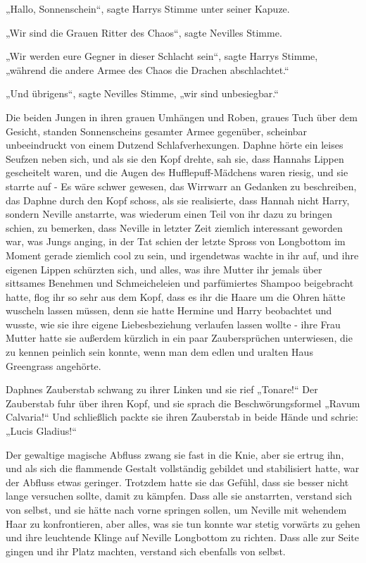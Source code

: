 {„Hallo, Sonnenschein“, sagte Harrys Stimme unter seiner Kapuze.

„Wir sind die Grauen Ritter des Chaos“, sagte Nevilles Stimme.

„Wir werden eure Gegner in dieser Schlacht sein“, sagte Harrys Stimme, „während die andere Armee des Chaos die Drachen abschlachtet.“

„Und übrigens“, sagte Nevilles Stimme, „wir sind unbesiegbar.“

Die beiden Jungen in ihren grauen Umhängen und Roben, graues Tuch über dem Gesicht, standen Sonnenscheins gesamter Armee gegenüber, scheinbar unbeeindruckt von einem Dutzend Schlafverhexungen. Daphne hörte ein leises Seufzen neben sich, und als sie den Kopf drehte, sah sie, dass Hannahs Lippen gescheitelt waren, und die Augen des Hufflepuff-Mädchens waren riesig, und sie starrte auf - Es wäre schwer gewesen, das Wirrwarr an Gedanken zu beschreiben, das Daphne durch den Kopf schoss, als sie realisierte, dass Hannah nicht Harry, sondern Neville anstarrte, was wiederum einen Teil von ihr dazu zu bringen schien, zu bemerken, dass Neville in letzter Zeit ziemlich interessant geworden war, was Jungs anging, in der Tat schien der letzte Spross von Longbottom im Moment gerade ziemlich cool zu sein, und irgendetwas wachte in ihr auf, und ihre eigenen Lippen schürzten sich, und alles, was ihre Mutter ihr jemals über sittsames Benehmen und Schmeicheleien und parfümiertes Shampoo beigebracht hatte, flog ihr so sehr aus dem Kopf, dass es ihr die Haare um die Ohren hätte wuscheln lassen müssen, denn sie hatte Hermine und Harry beobachtet und wusste, wie sie ihre eigene Liebesbeziehung verlaufen lassen wollte - ihre Frau Mutter hatte sie außerdem kürzlich in ein paar Zaubersprüchen unterwiesen, die zu kennen peinlich sein konnte, wenn man dem edlen und uralten Haus Greengrass angehörte.

Daphnes Zauberstab schwang zu ihrer Linken und sie rief „Tonare!“ Der Zauberstab fuhr über ihren Kopf, und sie sprach die Beschwörungsformel „Ravum Calvaria!“ Und schließlich packte sie ihren Zauberstab in beide Hände und schrie: „Lucis Gladius!“

Der gewaltige magische Abfluss zwang sie fast in die Knie, aber sie ertrug ihn, und als sich die flammende Gestalt vollständig gebildet und stabilisiert hatte, war der Abfluss etwas geringer. Trotzdem hatte sie das Gefühl, dass sie besser nicht lange versuchen sollte, damit zu kämpfen. Dass alle sie anstarrten, verstand sich von selbst, und sie hätte nach vorne springen sollen, um Neville mit wehendem Haar zu konfrontieren, aber alles, was sie tun konnte war stetig vorwärts zu gehen und ihre leuchtende Klinge auf Neville Longbottom zu richten. Dass alle zur Seite gingen und ihr Platz machten, verstand sich ebenfalls von selbst.

}
